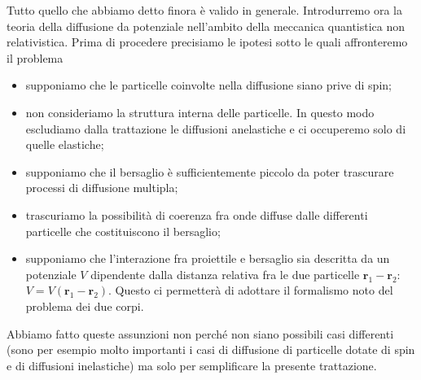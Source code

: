 \documentclass[a4paper,fleqn,twoside,12pt]{article}
\begin{document}
Tutto quello che abbiamo detto finora è valido in generale.  Introdurremo ora la
teoria della diffusione da potenziale nell'ambito della meccanica quantistica
non relativistica.  Prima di procedere precisiamo le ipotesi sotto le quali
affronteremo il problema
\begin{itemize}
\item supponiamo che le particelle coinvolte nella diffusione siano prive di
  spin;
\item non consideriamo la struttura interna delle particelle.  In questo modo
  escludiamo dalla trattazione le diffusioni anelastiche e ci occuperemo solo di
  quelle elastiche;
\item supponiamo che il bersaglio è sufficientemente piccolo da poter trascurare
  processi di diffusione multipla;
\item trascuriamo la possibilità di coerenza fra onde diffuse dalle differenti
  particelle che costituiscono il bersaglio;
\item supponiamo che l'interazione fra proiettile e bersaglio sia descritta da
  un potenziale $V$ dipendente dalla distanza relativa fra le due particelle
  $\bm{r}_{1} - \bm{r}_{2}$: $V = V(\bm{r}_{1} - \bm{r}_{2})$.  Questo ci
  permetterà di adottare il formalismo noto del problema dei due corpi.
\end{itemize}
Abbiamo fatto queste assunzioni non perché non siano possibili casi differenti
(sono per esempio molto importanti i casi di diffusione di particelle dotate di
spin e di diffusioni inelastiche) ma solo per semplificare la presente
trattazione.
\end{document}
